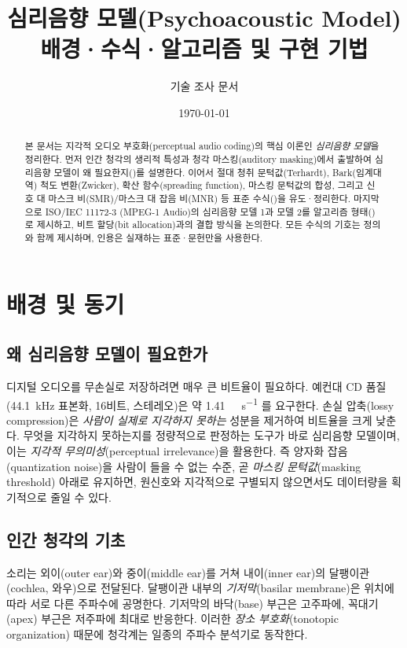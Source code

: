 \documentclass[11pt,a4paper]{article}
\title{\textbf{심리음향 모델(Psychoacoustic Model)}\\[0.3em]
       \large 배경·수식·알고리즘 및 구현 기법}
\author{기술 조사 문서}
\date{\today}
\begin{document}
\maketitle

\begin{abstract}
\noindent
본 문서는 지각적 오디오 부호화(perceptual audio coding)의 핵심 이론인 \emph{심리음향
모델}을 정리한다. 먼저 인간 청각의 생리적 특성과 청각 마스킹(auditory masking)에서
출발하여 심리음향 모델이 왜 필요한지()를 설명한다. 이어서 절대
청취 문턱값(Terhardt), Bark(임계대역) 척도 변환(Zwicker), 확산 함수(spreading
function), 마스킹 문턱값의 합성, 그리고 신호 대 마스크 비(SMR)/마스크 대 잡음
비(MNR) 등 표준 수식()을 유도·정리한다. 마지막으로 ISO/IEC 11172-3
(MPEG-1 Audio)의 심리음향 모델 1과 모델 2를 알고리즘 형태()로
제시하고, 비트 할당(bit allocation)과의 결합 방식을 논의한다. 모든 수식의 기호는
정의와 함께 제시하며, 인용은 실재하는 표준·문헌만을 사용한다.
\end{abstract}

\tableofcontents
\bigskip

\section{배경 및 동기}\label{sec:background}

\subsection{왜 심리음향 모델이 필요한가}
디지털 오디오를 무손실로 저장하려면 매우 큰 비트율이 필요하다. 예컨대 CD 품질
(\SI{44.1}{\kilo\hertz} 표본화, 16비트, 스테레오)은 약 \SI{1.41}{\mega\bit\per\second}
를 요구한다. 손실 압축(lossy compression)은 \emph{사람이 실제로 지각하지 못하는}
성분을 제거하여 비트율을 크게 낮춘다. 무엇을 지각하지 못하는지를 정량적으로
판정하는 도구가 바로 심리음향 모델이며, 이는 \emph{지각적 무의미성}(perceptual
irrelevance)을 활용한다. 즉 양자화 잡음(quantization noise)을 사람이 들을 수 없는
수준, 곧 \emph{마스킹 문턱값}(masking threshold) 아래로 유지하면, 원신호와 지각적으로
구별되지 않으면서도 데이터량을 획기적으로 줄일 수 있다.

\subsection{인간 청각의 기초}
소리는 외이(outer ear)와 중이(middle ear)를 거쳐 내이(inner ear)의
달팽이관(cochlea, 와우)으로 전달된다. 달팽이관 내부의 \emph{기저막}(basilar
membrane)은 위치에 따라 서로 다른 주파수에 공명한다. 기저막의 바닥(base) 부근은
고주파에, 꼭대기(apex) 부근은 저주파에 최대로 반응한다. 이러한 \emph{장소
부호화}(tonotopic organization) 때문에 청각계는 일종의 주파수 분석기로
동작한다.
\end{document}
